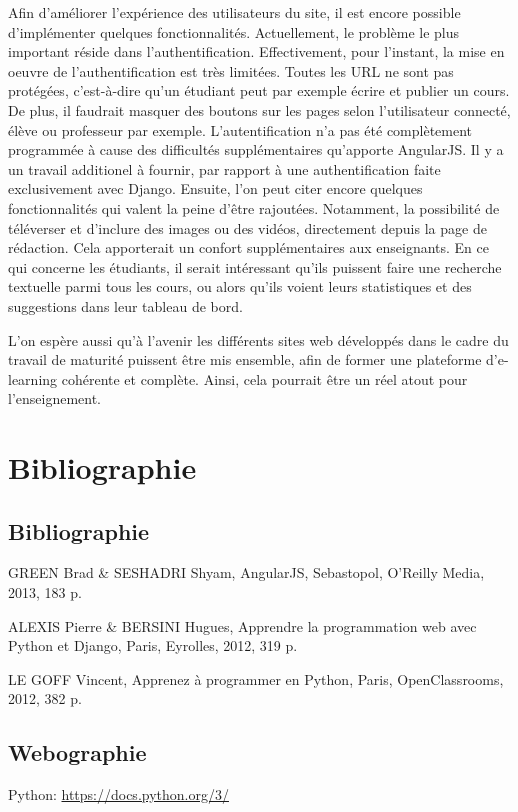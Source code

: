 \documentclass[a4paper,10pt,twoside]{sphinxmanual}
\begin{document}
Afin d'améliorer l'expérience des utilisateurs du site, il est encore possible d'implémenter quelques fonctionnalités. Actuellement, le problème le plus important réside dans l'authentification. Effectivement, pour l'instant, la mise en oeuvre de l'authentification est très limitées. Toutes les URL ne sont pas protégées, c'est-à-dire qu'un étudiant peut par exemple écrire et publier un cours. De plus, il faudrait masquer des boutons sur les pages selon l'utilisateur connecté, élève ou professeur par exemple. L'autentification n'a pas été complètement programmée à cause des difficultés supplémentaires qu'apporte AngularJS. Il y a un travail additionel à fournir, par rapport à une authentification faite exclusivement avec Django. Ensuite, l'on peut citer encore quelques fonctionnalités qui valent la peine d'être rajoutées. Notamment, la possibilité de téléverser et d'inclure des images ou des vidéos, directement depuis la page de rédaction. Cela apporterait un confort supplémentaires aux enseignants. En ce qui concerne les étudiants, il serait intéressant qu'ils puissent faire une recherche textuelle parmi tous les cours, ou alors qu'ils voient leurs statistiques et des suggestions dans leur tableau de bord.

L'on espère aussi qu'à l'avenir les différents sites web développés dans le cadre du travail de maturité puissent être mis ensemble, afin de former une plateforme d'e-learning cohérente et complète. Ainsi, cela pourrait être un réel atout pour l'enseignement.


\chapter{Bibliographie}
\label{bibliographie::doc}\label{bibliographie:bibliographie}

\section{Bibliographie}
\label{bibliographie:id1}
GREEN Brad \& SESHADRI Shyam, AngularJS, Sebastopol, O’Reilly Media, 2013, 183 p.

ALEXIS Pierre \& BERSINI Hugues, Apprendre la programmation web avec Python et Django, Paris, Eyrolles, 2012, 319 p.

LE GOFF Vincent, Apprenez à programmer en Python, Paris, OpenClassrooms, 2012, 382 p.


\section{Webographie}
\label{bibliographie:webographie}
Python: \href{https://docs.python.org/3/}{https://docs.python.org/3/}
\end{document}
